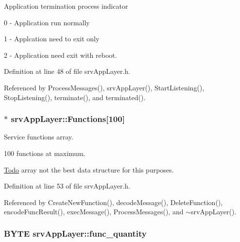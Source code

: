 Application termination process indicator
\begin{DoxyItemize}
\item 0 -\/ Application run normally
\item 1 -\/ Applcation need to exit only
\item 2 -\/ Application need exit with reboot. 
\end{DoxyItemize}



Definition at line 48 of file srvAppLayer.h.



Referenced by ProcessMessages(), srvAppLayer(), StartListening(), StopListening(), terminate(), and terminated().

\hypertarget{classsrvAppLayer_acaa27fb3d6e77e02afd272975c730c10}{
\subsubsection[{Functions}]{$\ast$ {\bf srvAppLayer::Functions}\mbox{[}100\mbox{]}}}
\label{d8/d72/classsrvAppLayer_acaa27fb3d6e77e02afd272975c730c10}


Service functions array. 

100 functions at maximum. \begin{Desc}
\item[\hyperlink{todo__todo000020}{Todo}]array not the best data structure for this purposes. \end{Desc}


Definition at line 53 of file srvAppLayer.h.



Referenced by CreateNewFunction(), decodeMessage(), DeleteFunction(), encodeFuncResult(), execMessage(), ProcessMessages(), and $\sim$srvAppLayer().

\hypertarget{classsrvAppLayer_ae6b6a999a1e0da7f17da9aba933f1f6b}{
\subsubsection[{func\_\-quantity}]{\setlength{\rightskip}{0pt plus 5cm}BYTE {\bf srvAppLayer::func\_\-quantity}}}
\label{d8/d72/classsrvAppLayer_ae6b6a999a1e0da7f17da9aba933f1f6b}


